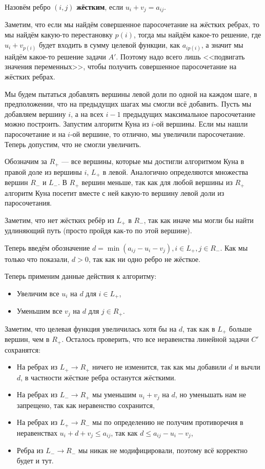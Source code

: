 \begin{Def}
  Назовём ребро $(i, j)$ \textbf{жёстким}, если $u_i + v_j = a_{ij}$.
\end{Def}

Заметим, что если мы найдём совершенное паросочетание на жёстких ребрах, то
мы найдём какую-то перестановку $p(i)$, тогда мы найдём какое-то решение, где
$u_i + v_{p(i)}$ будет входить в сумму целевой функции, как $a_{ip(i)}$, а значит
мы найдём какое-то решение задачи $A'$. Поэтому надо всего лишь <<подвигать
значения переменных>>, чтобы получить совершенное паросочетание на жёстких ребрах.

Мы будем пытаться добавлять вершины левой доли по одной на каждом шаге, в предположении,
что на предыдущих шагах мы смогли всё добавить. Пусть мы добавляем вершину $i$,
а на всех $i-1$ предыдущих максимальное паросочетание можно построить. Запустим
алгоритм Куна из $i$-ой вершины. Если мы нашли паросочетание и на $i$-ой вершине,
то отлично, мы увеличили паросочетание. Теперь допустим, что не смогли увеличить.

Обозначим за $R_{+}$ --- все вершины, которые мы достигли алгоритмом
Куна в правой доле из вершины $i$,
$L_{+}$ в левой. Аналогично определяются множества вершин
$R_{-}$ и $L_{-}$. В $R_{+}$ вершин меньше, так как для любой вершины из
$R_+$ алгоритм Куна посетит вместе с ней какую-то вершину левой доли из
паросочетания. 

Заметим, что нет жёстких ребёр из $L_+$ в $R_-$, так как иначе мы могли бы
найти удлиняющий путь (просто пройдя как-то по этой вершине).

Теперь введём обозначение $d = \min(a_{ij} - u_i - v_j), i \in L_+, j \in R_-$.
Как мы только что показали, $d > 0$, так как ни одно ребро не жёсткое.

Теперь применим данные действия к алгоритму:

\begin{itemize}
  \item Увеличим все $u_i$ на $d$ для $i \in L_+$,
  \item Уменьшим все $v_j$ на $d$ для $j \in R_+$. 
\end{itemize}

Заметим, что целевая функция увеличилась хотя бы на $d$, так как в $L_+$ больше
вершин, чем в $R_+$. Осталось проверить, что все неравенства линейной задачи $C'$
сохранятся:

\begin{itemize}
  \item На ребрах из $L_+ \to R_+$ ничего не изменится, так как мы добавили
  $d$ и вычли $d$, в частности жёсткие ребра останутся жёсткими.
  \item На ребрах из $L_- \to R_+$ мы уменьшим $u_i + v_j$ на $d$, но уменьшать
  нам не запрещено, так как неравенство сохранится,
  \item На ребрах из $L_+ \to R_-$ мы по определению не получим противоречия
  в неравенствах $u_i + d + v_j \leqslant a_{ij}$, так как $d \leqslant a_{ij} - u_i - v_j$,
  \item Ребра из $L_- \to R_-$ мы никак не модифицировали, поэтому всё корректно
  будет и тут.
\end{itemize}

